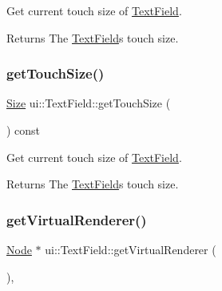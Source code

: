 Get current touch size of \hyperlink{classui_1_1TextField}{Text\+Field}. 

\begin{DoxyReturn}{Returns}
The \hyperlink{classui_1_1TextField}{Text\+Field}\textquotesingle{}s touch size. 
\end{DoxyReturn}
\mbox{\label{classui_1_1TextField_a4aee73c65ff1fcf04d2049ff9ac5c050}} 
\subsubsection{\texorpdfstring{get\+Touch\+Size()}{getTouchSize()}\hspace{0.1cm}{\footnotesize\ttfamily [2/2]}}
{\footnotesize\ttfamily \hyperlink{classSize}{Size} ui\+::\+Text\+Field\+::get\+Touch\+Size (\begin{DoxyParamCaption}{ }\end{DoxyParamCaption}) const}



Get current touch size of \hyperlink{classui_1_1TextField}{Text\+Field}. 

\begin{DoxyReturn}{Returns}
The \hyperlink{classui_1_1TextField}{Text\+Field}\textquotesingle{}s touch size. 
\end{DoxyReturn}
\mbox{\label{classui_1_1TextField_a63b989aa3b2a11854b1a7e2bf4659a40}} 
\subsubsection{\texorpdfstring{get\+Virtual\+Renderer()}{getVirtualRenderer()}\hspace{0.1cm}{\footnotesize\ttfamily [1/2]}}
{\footnotesize\ttfamily \hyperlink{classNode}{Node} $\ast$ ui\+::\+Text\+Field\+::get\+Virtual\+Renderer (\begin{DoxyParamCaption}{ }\end{DoxyParamCaption})\hspace{0.3cm}{\ttfamily [override]}, {\ttfamily [virtual]}}

